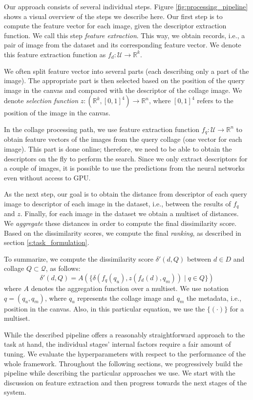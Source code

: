 Our approach consists of several individual steps. Figure \ref{fig:processing_pipeline} shows a visual overview of the steps we describe here. Our first step is to compute the feature vector for each image, given the descriptor extraction function. We call this step \emph{feature extraction}. This way, we obtain records, i.e., a pair of image from the dataset and its corresponding feature vector. We denote this feature extraction function as $f_d:\mathcal{U} \rightarrow \mathbb{R}^k$.

We often split feature vector into several parts (each describing only a part of the image). The appropriate part is then selected based on the position of the query image in the canvas and compared with the descriptor of the collage image. We denote \emph{selection function} $z: (\mathbb{R}^k, [0,1]^4) \rightarrow \mathbb{R}^n$, where $[0,1]^4$ refers to the position of the image in the canvas.

In the collage processing path, we use feature extraction function $f_q: \mathcal{U} \rightarrow \mathbb{R}^n$ to obtain feature vectors of the images from the query collage (one vector for each image). This part is done online; therefore, we need to be able to obtain the descriptors on the fly to perform the search. Since we only extract descriptors for a couple of images, it is possible to use the predictions from the neural networks even without access to GPU.

As the next step, our goal is to obtain the distance from descriptor of each query image to descriptor of each image in the dataset, i.e., between the results of $f_q$ and $z$. Finally, for each image in the dataset we obtain a multiset of distances. We \emph{aggregate} these distances in order to compute the final dissimilarity score. Based on the dissimilarity scores, we compute the final \emph{ranking}, as described in section \ref{s:task_formulation}.

To summarize, we compute the dissimilarity score $\delta'(d, Q)$ between $d \in D$ and collage $Q \subset \mathcal{Q}$, as follows:
$$
   \delta'(d, Q) = A(\{\delta(f_q(q_u), z(f_d(d), q_m)) \mid q\in Q\})
$$
where $A$ denotes the aggregation function over a multiset. We use notation $q = (q_u, q_m)$, where $q_u$ represents the collage image and $q_m$ the metadata, i.e., position in the canvas. Also, in this particular equation, we use the $\{(\cdot)\}$ for a multiset.

While the described pipeline offers a reasonably straightforward approach to the task at hand, the individual stages' internal factors require a fair amount of tuning. We evaluate the hyperparameters with respect to the performance of the whole framework. Throughout the following sections, we progressively build the pipeline while describing the particular approaches we use. We start with the discussion on feature extraction and then progress towards the next stages of the system.  

